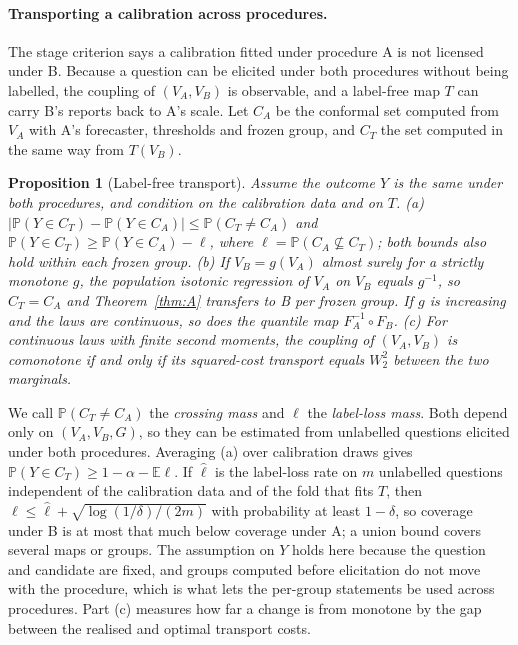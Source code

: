 \documentclass[11pt]{article}
\newtheorem{proposition}[theorem]{Proposition}
\theoremstyle{definition}
\theoremstyle{remark}
\newcommand{\E}{\mathbb{E}}
\renewcommand{\P}{\mathbb{P}}
\newcommand{\1}{\mathbf{1}}
\begin{document}
\paragraph{Transporting a calibration across procedures.} The stage criterion says a calibration
fitted under procedure A is not licensed under B. Because a question can be elicited under both
procedures without being labelled, the coupling of $(V_A,V_B)$ is observable, and a label-free map
$T$ can carry B's reports back to A's scale. Let $C_A$ be the conformal set computed from $V_A$ with
A's forecaster, thresholds and frozen group, and $C_T$ the set computed in the same way from
$T(V_B)$.

\begin{proposition}[Label-free transport]
\label{prop:transport}
Assume the outcome $Y$ is the same under both procedures, and condition on the calibration data and on $T$.
(a) $|\P(Y\in C_T)-\P(Y\in C_A)|\le\P(C_T\ne C_A)$ and $\P(Y\in C_T)\ge\P(Y\in C_A)-\ell$, where
$\ell=\P(C_A\not\subseteq C_T)$; both bounds also hold within each frozen group.
(b) If $V_B=g(V_A)$ almost surely for a strictly monotone $g$, the population isotonic regression of $V_A$ on
$V_B$ equals $g^{-1}$, so $C_T=C_A$ and Theorem~\ref{thm:A} transfers to B per frozen group. If $g$ is
increasing and the laws are continuous, so does the quantile map $F_A^{-1}\circ F_B$.
(c) For continuous laws with finite second moments, the coupling of $(V_A,V_B)$ is comonotone if and only if its
squared-cost transport equals $W_2^2$ between the two marginals.
\end{proposition}
We call $\P(C_T\ne C_A)$ the \emph{crossing mass} and $\ell$ the \emph{label-loss mass}. Both depend only on
$(V_A,V_B,G)$, so they can be estimated from unlabelled questions elicited under both procedures. Averaging (a)
over calibration draws gives $\P(Y\in C_T)\ge1-\alpha-\E\ell$. If $\hat\ell$ is the label-loss rate on $m$
unlabelled questions independent of the calibration data and of the fold that fits $T$, then
$\ell\le\hat\ell+\sqrt{\log(1/\delta)/(2m)}$ with probability at least $1-\delta$, so coverage under B is at most that
much below coverage under A; a union bound covers several maps or groups. The assumption on $Y$ holds here
because the question and candidate are fixed, and groups computed before elicitation do not move with the
procedure, which is what lets the per-group statements be used across procedures. Part (c) measures how far a
change is from monotone by the gap between the realised and optimal transport costs.
\end{document}
